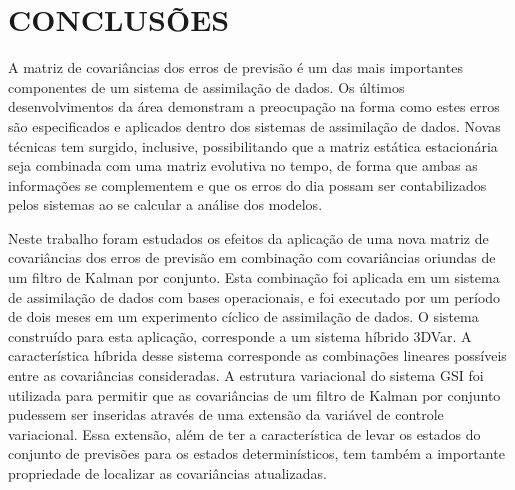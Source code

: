 \chapter{CONCLUSÕES}

A matriz de covariâncias dos erros de previsão é um das mais importantes componentes de um sistema de assimilação de dados. Os últimos desenvolvimentos da área demonstram a preocupação na forma como estes erros são especificados e aplicados dentro dos sistemas de assimilação de dados. Novas técnicas tem surgido, inclusive, possibilitando que a matriz estática estacionária seja combinada com uma matriz evolutiva no tempo, de forma que ambas as informações se complementem e que os erros do dia possam ser contabilizados pelos sistemas ao se calcular a análise dos modelos.

Neste trabalho foram estudados os efeitos da aplicação de uma nova matriz de covariâncias dos erros de previsão em combinação com covariâncias oriundas de um filtro de Kalman por conjunto. Esta combinação foi aplicada em um sistema de assimilação de dados com bases operacionais, e foi executado por um período de dois meses em um experimento cíclico de assimilação de dados. O sistema construído para esta aplicação, corresponde a um sistema híbrido 3DVar. A característica híbrida desse sistema corresponde as combinações lineares possíveis entre as covariâncias consideradas. A estrutura variacional do sistema GSI foi utilizada para permitir que as covariâncias de um filtro de Kalman por conjunto pudessem ser inseridas através de uma extensão da variável de controle variacional. Essa extensão, além de ter a característica de levar os estados do conjunto de previsões para os estados determinísticos, tem também a importante propriedade de localizar as covariâncias atualizadas. 

